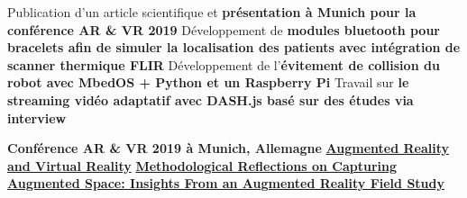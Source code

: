 \documentclass[10pt,a4paper,ragged2e,withhyper]{altacv}
\begin{document}
%
%
%

\newpage
{}
\begin{paracol}{2}

Publication d'un article scientifique et \textbf{présentation à Munich pour la conférence AR \& VR 2019}
\smallbreak
\divider
{}
Développement de \textbf{modules bluetooth pour bracelets afin de simuler la localisation des patients avec intégration de scanner thermique FLIR}
\smallbreak
\divider
{}
Développement de l'\textbf{évitement de collision du robot avec MbedOS + Python et un Raspberry Pi}
\smallbreak
\divider
{}
Travail sur \textbf{le streaming vidéo adaptatif avec DASH.js basé sur des études via interview}

\medskip
{}
\smallbreak
\textbf{Conférence AR \& VR 2019 à Munich, Allemagne}
\smallbreak
\smallbreak
{}
\smallbreak
\href{https://doi.org/10.1007/978-3-030-37869-1}{\textbf{Augmented Reality and Virtual Reality}}
\smallbreak
\href{https://www.cogitatiopress.com/mediaandcommunication/article/view/5316/2797}{\textbf{Methodological Reflections on Capturing Augmented Space: Insights From an Augmented Reality Field Study}}



\end{paracol}
\end{document}
